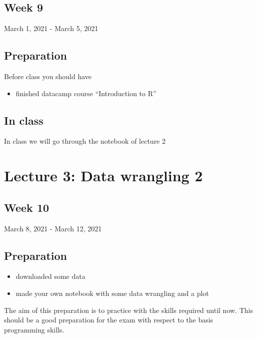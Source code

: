 \documentclass[
]{book}
\providecommand{\tightlist}{%
  \setlength{\itemsep}{0pt}\setlength{\parskip}{0pt}}
\begin{document}
\hypertarget{week-9}{%
\subsection{Week 9}\label{week-9}}

March 1, 2021 - March 5, 2021

\hypertarget{preparation-1}{%
\subsection{Preparation}\label{preparation-1}}

Before class you should have

\begin{itemize}
\tightlist
\item
  finished datacamp course ``Introduction to R''
\end{itemize}

\hypertarget{in-class-1}{%
\subsection{In class}\label{in-class-1}}

In class we will go through the notebook of lecture 2

\hypertarget{lecture-3-data-wrangling-2}{%
\section{Lecture 3: Data wrangling 2}\label{lecture-3-data-wrangling-2}}

\hypertarget{week-10}{%
\subsection{Week 10}\label{week-10}}

March 8, 2021 - March 12, 2021

\hypertarget{preparation-2}{%
\subsection{Preparation}\label{preparation-2}}

\begin{itemize}
\tightlist
\item
  downloaded some data
\item
  made your own notebook with some data wrangling and a plot
\end{itemize}

The aim of this preparation is to practice with the skills required until now. This should be a good preparation for the exam with respect to the basis programming skills.
\end{document}
